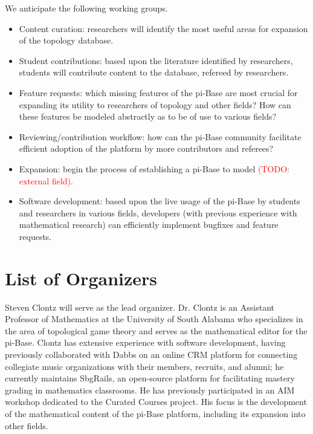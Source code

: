 \documentclass{amsart}
\newcommand{\TODO}[1]{\textcolor{red}{(TODO: #1)}}
\begin{document}
We anticipate the following working groups.

\begin{itemize}
    \item Content curation: researchers will identify the
      most useful areas for expansion of the topology database. 
    \item Student contributions: based upon the literature identified
      by researchers, students will contribute content to the database,
      refereed by researchers. 
    \item Feature requests: which missing features of the pi-Base
      are most crucial for expanding its utility to researchers of
      topology and other
      fields? How can these features be modeled abstractly as to
      be of use to various fields?
    \item Reviewing/contribution workflow: how can the pi-Base
      community facilitate efficient adoption of the platform
      by more contributors and referees?
    \item Expansion: begin the process of establishing a pi-Base
      to model \TODO{external field}.
    \item Software development: based upon the live usage of the
      pi-Base by students and researchers in various fields, 
      developers (with previous experience with mathematical research) 
      can efficiently
      implement bugfixes and feature requests.
\end{itemize}

\section{List of Organizers}

Steven Clontz will serve as the lead organizer. Dr. Clontz is an Assistant
Professor of Mathematics at the University of South Alabama who specializes
in the area of topological game theory and serves as the mathematical editor
for the pi-Base. 
Clontz has extensive experience with software development, having
previously collaborated with Dabbs on an online CRM platform for connecting
collegiate music organizations with their members, recruits, and alumni;
he currently maintains SbgRails, an open-source platform 
for facilitating mastery grading in mathematics classrooms. He has
previously participated in an AIM workshop dedicated to the Curated Courses
project. His focus is the development of the mathematical content
of the pi-Base platform, including its expansion into other fields.
\end{document}
